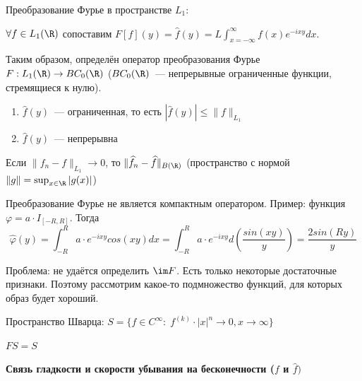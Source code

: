 \begin{definition}
    Преобразование Фурье в пространстве $L_1$:
    
    $\forall f \in L_1(\R)$ сопоставим $F[f](y) = \widehat{f}(y) = L \int_{x = -\infty}^{\infty} f(x) e^{-ixy} dx$.

    Таким образом, определён оператор преобразования Фурье
    $F: L_1(\R) \to BC_0(\R)$ ($BC_0(\R)$~--- непрерывные ограниченные функции, стремящиеся к нулю).
\end{definition}

\begin{statement}
    \begin{enumerate}
     \item $\widehat{f}(y)$~--- ограниченная, то есть $|\widehat{f}(y)| \leqslant \|f\|_{L_1}$
     \item $\widehat{f}(y)$~--- непрерывна
    \end{enumerate}
\end{statement}

\begin{statement}
    Если $\|f_n - f\|_{L_1} \to 0$, то $\|\widehat{f}_n - \widehat{f}\|_{B(\R)}$ (пространство с нормой $\|g\| = \sup_{x \in \R} |g(x)|$)
\end{statement}

\begin{example}
    Преобразование Фурье не является компактным оператором. Пример: функция $\varphi = a \cdot I_{[-R, R]}$. Тогда 
    \[
    \widehat{\varphi}(y) = 
    \int_{-R}^R a \cdot e^{-ixy} cos(xy) dx = \int_{-R}^R a \cdot e^{-ixy} d\left( \frac{sin(xy)}{y} \right) = \frac{2 sin(Ry)}{y}
    \]
\end{example}


Проблема: не удаётся определить $\im F$. Есть только некоторые достаточные признаки. Поэтому рассмотрим какое-то подмножество функций, для которых образ будет хороший.

\begin{definition}
    Пространство Шварца: $S=\{f \in C^\infty : \; f^{(k)} \cdot |x|^n \to 0, x \to \infty \}$
\end{definition}

\begin{statement}[б/д]
    $FS = S$
\end{statement}

\textbf{Связь гладкости и скорости убывания на бесконечности ($f$ и $\widehat{f})$}

